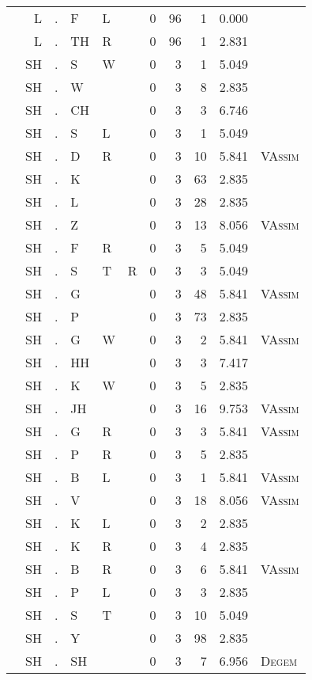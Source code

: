 \begin{longtable}{r@{ } r@{ } c@{ } l@{ } l@{ } l@{ } r r r r l }
 & L & . & F & L &  & 0 & 96 & 1 & 0.000 &  \\
 & L & . & TH & R &  & 0 & 96 & 1 & 2.831 &  \\
 & SH & . & S & W &  & 0 & 3 & 1 & 5.049 &  \\
 & SH & . & W &  &  & 0 & 3 & 8 & 2.835 &  \\
 & SH & . & CH &  &  & 0 & 3 & 3 & 6.746 &  \\
 & SH & . & S & L &  & 0 & 3 & 1 & 5.049 &  \\
 & SH & . & D & R &  & 0 & 3 & 10 & 5.841 & \textsc{VAssim} \\
 & SH & . & K &  &  & 0 & 3 & 63 & 2.835 &  \\
 & SH & . & L &  &  & 0 & 3 & 28 & 2.835 &  \\
 & SH & . & Z &  &  & 0 & 3 & 13 & 8.056 & \textsc{VAssim} \\
 & SH & . & F & R &  & 0 & 3 & 5 & 5.049 &  \\
 & SH & . & S & T & R & 0 & 3 & 3 & 5.049 &  \\
 & SH & . & G &  &  & 0 & 3 & 48 & 5.841 & \textsc{VAssim} \\
 & SH & . & P &  &  & 0 & 3 & 73 & 2.835 &  \\
 & SH & . & G & W &  & 0 & 3 & 2 & 5.841 & \textsc{VAssim} \\
 & SH & . & HH &  &  & 0 & 3 & 3 & 7.417 &  \\
 & SH & . & K & W &  & 0 & 3 & 5 & 2.835 &  \\
 & SH & . & JH &  &  & 0 & 3 & 16 & 9.753 & \textsc{VAssim} \\
 & SH & . & G & R &  & 0 & 3 & 3 & 5.841 & \textsc{VAssim} \\
 & SH & . & P & R &  & 0 & 3 & 5 & 2.835 &  \\
 & SH & . & B & L &  & 0 & 3 & 1 & 5.841 & \textsc{VAssim} \\
 & SH & . & V &  &  & 0 & 3 & 18 & 8.056 & \textsc{VAssim} \\
 & SH & . & K & L &  & 0 & 3 & 2 & 2.835 &  \\
 & SH & . & K & R &  & 0 & 3 & 4 & 2.835 &  \\
 & SH & . & B & R &  & 0 & 3 & 6 & 5.841 & \textsc{VAssim} \\
 & SH & . & P & L &  & 0 & 3 & 3 & 2.835 &  \\
 & SH & . & S & T &  & 0 & 3 & 10 & 5.049 &  \\
 & SH & . & Y &  &  & 0 & 3 & 98 & 2.835 &  \\
 & SH & . & SH &  &  & 0 & 3 & 7 & 6.956 & \textsc{Degem} \\

\end{longtable}
